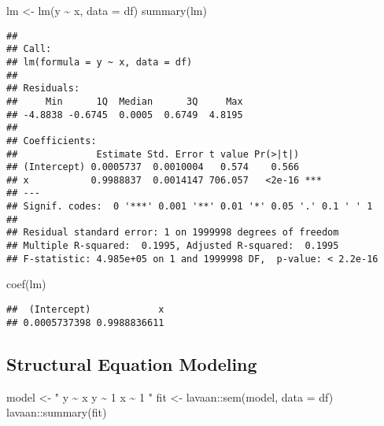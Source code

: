 \documentclass[
]{book}
\newenvironment{Shaded}{\begin{snugshade}}{\end{snugshade}}
\newcommand{\AttributeTok}[1]{\textcolor[rgb]{0.77,0.63,0.00}{#1}}
\newcommand{\FunctionTok}[1]{\textcolor[rgb]{0.00,0.00,0.00}{#1}}
\newcommand{\NormalTok}[1]{#1}
\newcommand{\OtherTok}[1]{\textcolor[rgb]{0.56,0.35,0.01}{#1}}
\newcommand{\SpecialCharTok}[1]{\textcolor[rgb]{0.00,0.00,0.00}{#1}}
\newcommand{\StringTok}[1]{\textcolor[rgb]{0.31,0.60,0.02}{#1}}
\theoremstyle{definition}
\theoremstyle{definition}
\theoremstyle{definition}
\theoremstyle{remark}
\begin{document}
\begin{Shaded}
\begin{Highlighting}[]
\NormalTok{lm }\OtherTok{\textless{}{-}} \FunctionTok{lm}\NormalTok{(y }\SpecialCharTok{\textasciitilde{}}\NormalTok{ x, }\AttributeTok{data =}\NormalTok{ df)}
\FunctionTok{summary}\NormalTok{(lm)}
\end{Highlighting}
\end{Shaded}

\begin{verbatim}
## 
## Call:
## lm(formula = y ~ x, data = df)
## 
## Residuals:
##     Min      1Q  Median      3Q     Max 
## -4.8838 -0.6745  0.0005  0.6749  4.8195 
## 
## Coefficients:
##              Estimate Std. Error t value Pr(>|t|)    
## (Intercept) 0.0005737  0.0010004   0.574    0.566    
## x           0.9988837  0.0014147 706.057   <2e-16 ***
## ---
## Signif. codes:  0 '***' 0.001 '**' 0.01 '*' 0.05 '.' 0.1 ' ' 1
## 
## Residual standard error: 1 on 1999998 degrees of freedom
## Multiple R-squared:  0.1995, Adjusted R-squared:  0.1995 
## F-statistic: 4.985e+05 on 1 and 1999998 DF,  p-value: < 2.2e-16
\end{verbatim}

\begin{Shaded}
\begin{Highlighting}[]
\FunctionTok{coef}\NormalTok{(lm)}
\end{Highlighting}
\end{Shaded}

\begin{verbatim}
##  (Intercept)            x 
## 0.0005737398 0.9988836611
\end{verbatim}

\hypertarget{structural-equation-modeling}{%
\subsection{Structural Equation Modeling}\label{structural-equation-modeling}}

\begin{Shaded}
\begin{Highlighting}[]
\NormalTok{model }\OtherTok{\textless{}{-}} \StringTok{"}
\StringTok{  y \textasciitilde{} x}
\StringTok{  y \textasciitilde{} 1}
\StringTok{  x \textasciitilde{} 1}
\StringTok{"}
\NormalTok{fit }\OtherTok{\textless{}{-}}\NormalTok{ lavaan}\SpecialCharTok{::}\FunctionTok{sem}\NormalTok{(model, }\AttributeTok{data =}\NormalTok{ df)}
\NormalTok{lavaan}\SpecialCharTok{::}\FunctionTok{summary}\NormalTok{(fit)}
\end{Highlighting}
\end{Shaded}
\end{document}
